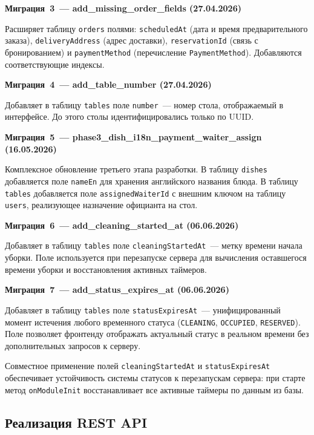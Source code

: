 \textbf{Миграция~3~--- add\_missing\_order\_fields (27.04.2026)}

Расширяет таблицу \texttt{orders} полями: \texttt{scheduledAt}
(дата и время предварительного заказа), \texttt{deliveryAddress}
(адрес доставки), \texttt{reservationId} (связь с бронированием) и
\texttt{paymentMethod} (перечисление \texttt{PaymentMethod}).
Добавляются соответствующие индексы.

\textbf{Миграция~4~--- add\_table\_number (27.04.2026)}

Добавляет в таблицу \texttt{tables} поле \texttt{number}~--- номер
стола, отображаемый в интерфейсе. До этого столы идентифицировались
только по UUID.

\textbf{Миграция~5~--- phase3\_dish\_i18n\_payment\_waiter\_assign
(16.05.2026)}

Комплексное обновление третьего этапа разработки. В таблицу
\texttt{dishes} добавляется поле \texttt{nameEn} для хранения
английского названия блюда. В таблицу \texttt{tables} добавляется поле
\texttt{assignedWaiterId} с внешним ключом на таблицу \texttt{users},
реализующее назначение официанта на стол.

\textbf{Миграция~6~--- add\_cleaning\_started\_at (06.06.2026)}

Добавляет в таблицу \texttt{tables} поле \texttt{cleaningStartedAt}~---
метку времени начала уборки. Поле используется при перезапуске сервера
для вычисления оставшегося времени уборки и восстановления активных
таймеров.

\textbf{Миграция~7~--- add\_status\_expires\_at (06.06.2026)}

Добавляет в таблицу \texttt{tables} поле \texttt{statusExpiresAt}~---
унифицированный момент истечения любого временного статуса
(\texttt{CLEANING}, \texttt{OCCUPIED}, \texttt{RESERVED}). Поле
позволяет фронтенду отображать актуальный статус в реальном времени
без дополнительных запросов к серверу.

Совместное применение полей \texttt{cleaningStartedAt} и
\texttt{statusExpiresAt} обеспечивает устойчивость системы статусов
к перезапускам сервера: при старте метод \texttt{onModuleInit}
восстанавливает все активные таймеры по данным из базы.

\subsection{Реализация REST API}

